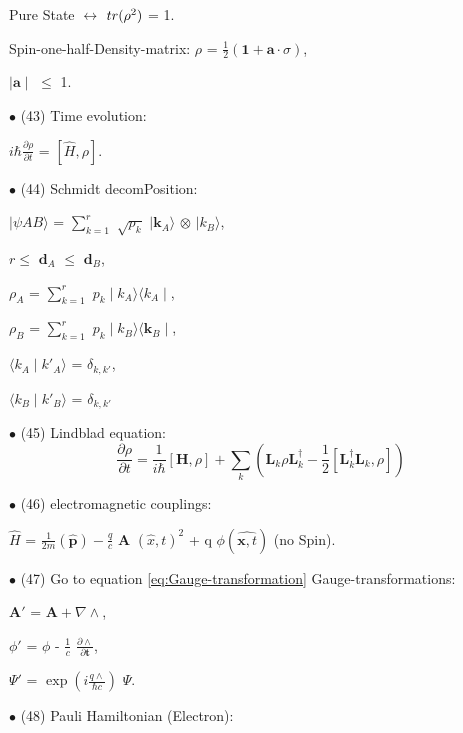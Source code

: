 \documentclass[a4paper, 10pt, onepage]{elegantbook}
\begin{document}
{Pure State $\longleftrightarrow$ $\mathbf \mathbf{tr}(\rho^2)$ = 1.  
   
Spin-one-half-Density-matrix: $\rho$ = $\frac{1}{2} ( \mathbf{1} + \mathbf a \cdot 
\sigma)$,  

$\mid \mathbf a \mid$ $\leq$ 1.  

$\bullet$ (43) Time evolution:  

$i \hbar \frac{\partial \rho}{\partial t}$ = $ [ \hat{H}, \rho]$.  

$\bullet$ (44) Schmidt decomPosition: 

$\mid  \psi AB \rangle$ = $ \sum_{k = 1}^r$ $\sqrt {\mathit p_k}$ $\mid \mathbf k_A \rangle$ $\otimes$ $\mid  \mathit 
k_B \rangle$,  

$r \leq$ $\mathbf d_A$ $\leq$ $\mathbf d_B$, 

$\rho_A$ = $ \sum_{k =1}^r$ $ \mathit p_k \mid \mathit k_A \rangle \langle \mathit k_A \mid$,  

$\rho_B$ = $ \sum_{k =1}^r$ $ \mathit p_k \mid \mathit k_B  \rangle \langle \mathbf k_B \mid$,  

$\langle k_A \mid k'_A \rangle$ = $\delta_{k,k'}$, 

$\langle k_B \mid k'_B \rangle$ = $\delta_{k,k'}$  

$\bullet$ (45) Lindblad equation:  
\begin{equation}
\frac{\partial \rho} {\partial t} = \frac{1} {i \hbar} [ \mathbf H, \rho ] +  \sum_k ( \mathbf L_k \rho \mathbf 
L^\dagger_k - \frac{1} {2}[ \mathbf L^\dagger_k \mathbf L_k, \rho])
\end{equation}

$\bullet$ (46) electromagnetic couplings:  

$\hat{H}$ = $\frac{1}{2m}(\hat{\mathbf p}) - \frac{q}{c}$ $\mathbf A$ $(\hat{x}, t)^2$ + q $\phi(\hat{\mathbf x, t})$ 
(no Spin).  

$\bullet$ (47) Go to equation \eqref{eq:Gauge-transformation} \quad Gauge-transformations: 
 

$\mathbf A'$ = $\mathbf A + \nabla \wedge$,   

$\phi'$ = $\phi$ - $\frac{1}{c}$ $ \frac{\partial \wedge}{\partial {\mathbf t}}$, 

$\Psi'$ = $\exp(i \frac{q \wedge}{\hbar c})$ $\Psi$.  

$\bullet$ (48) Pauli Hamiltonian (Electron):  

}
\end{document}
